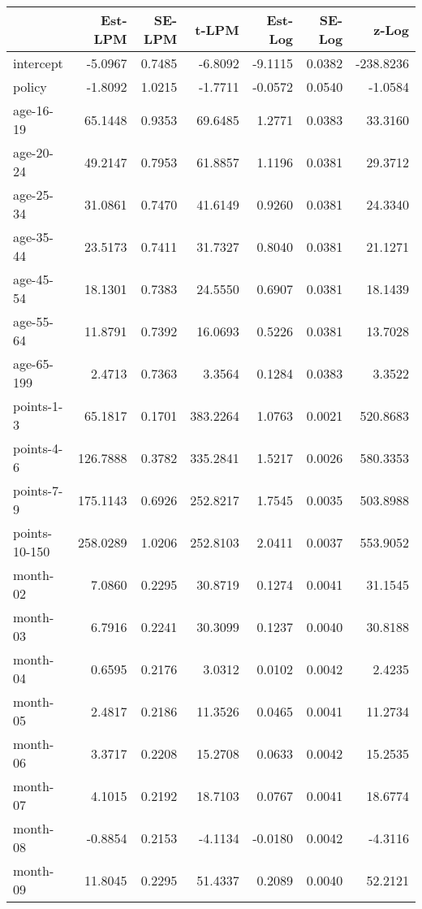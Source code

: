 \documentclass[10pt]{article}
\begin{document}
\begin{table}[ht]
\centering
\begin{tabular}{lrrrrrr}
  \hline
 & Est-LPM & SE-LPM & t-LPM & Est-Log & SE-Log & z-Log \\ 
  \hline
intercept & -5.0967 & 0.7485 & -6.8092 & -9.1115 & 0.0382 & -238.8236 \\ 
  policy & -1.8092 & 1.0215 & -1.7711 & -0.0572 & 0.0540 & -1.0584 \\ 
  age-16-19 & 65.1448 & 0.9353 & 69.6485 & 1.2771 & 0.0383 & 33.3160 \\ 
  age-20-24 & 49.2147 & 0.7953 & 61.8857 & 1.1196 & 0.0381 & 29.3712 \\ 
  age-25-34 & 31.0861 & 0.7470 & 41.6149 & 0.9260 & 0.0381 & 24.3340 \\ 
  age-35-44 & 23.5173 & 0.7411 & 31.7327 & 0.8040 & 0.0381 & 21.1271 \\ 
  age-45-54 & 18.1301 & 0.7383 & 24.5550 & 0.6907 & 0.0381 & 18.1439 \\ 
  age-55-64 & 11.8791 & 0.7392 & 16.0693 & 0.5226 & 0.0381 & 13.7028 \\ 
  age-65-199 & 2.4713 & 0.7363 & 3.3564 & 0.1284 & 0.0383 & 3.3522 \\ 
  points-1-3 & 65.1817 & 0.1701 & 383.2264 & 1.0763 & 0.0021 & 520.8683 \\ 
  points-4-6 & 126.7888 & 0.3782 & 335.2841 & 1.5217 & 0.0026 & 580.3353 \\ 
  points-7-9 & 175.1143 & 0.6926 & 252.8217 & 1.7545 & 0.0035 & 503.8988 \\ 
  points-10-150 & 258.0289 & 1.0206 & 252.8103 & 2.0411 & 0.0037 & 553.9052 \\ 
  month-02 & 7.0860 & 0.2295 & 30.8719 & 0.1274 & 0.0041 & 31.1545 \\ 
  month-03 & 6.7916 & 0.2241 & 30.3099 & 0.1237 & 0.0040 & 30.8188 \\ 
  month-04 & 0.6595 & 0.2176 & 3.0312 & 0.0102 & 0.0042 & 2.4235 \\ 
  month-05 & 2.4817 & 0.2186 & 11.3526 & 0.0465 & 0.0041 & 11.2734 \\ 
  month-06 & 3.3717 & 0.2208 & 15.2708 & 0.0633 & 0.0042 & 15.2535 \\ 
  month-07 & 4.1015 & 0.2192 & 18.7103 & 0.0767 & 0.0041 & 18.6774 \\ 
  month-08 & -0.8854 & 0.2153 & -4.1134 & -0.0180 & 0.0042 & -4.3116 \\ 
  month-09 & 11.8045 & 0.2295 & 51.4337 & 0.2089 & 0.0040 & 52.2121 \\ 

\end{tabular}
\end{table}
\end{document}

